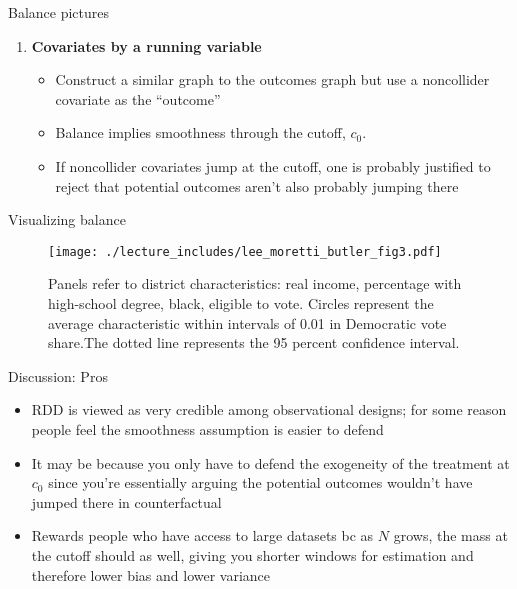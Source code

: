 \documentclass{beamer}
\begin{document}
\begin{frame}{Balance pictures}

\begin{enumerate}\addtocounter{enumi}{3}
	\item \textbf{Covariates by a running variable}
		\begin{itemize}
		\item Construct a similar graph to the outcomes graph but use a noncollider covariate as the ``outcome''
		\item Balance implies smoothness through the cutoff, $c_0$.  
		\item If noncollider covariates jump at the cutoff, one is probably justified to reject that potential outcomes aren't also probably jumping there
		\end{itemize}
	\end{enumerate}
\end{frame}

\begin{frame}{Visualizing balance}
	\begin{figure}
	\texttt{[image: ./lecture\_includes/lee\_moretti\_butler\_fig3.pdf]}
	\caption{\scriptsize Panels refer to district characteristics: real income, percentage with high-school degree, black, eligible to vote. Circles represent the average characteristic within intervals of 0.01 in Democratic vote share.The dotted line represents the 95 percent confidence interval.}
	\end{figure}
	
\end{frame}






\begin{frame}{Discussion: Pros}

\begin{itemize}
\item RDD is viewed as very credible among observational designs; for some reason people feel the smoothness assumption is easier to defend
\item It may be because you only have to defend the exogeneity of the treatment at $c_0$ since you're essentially arguing the potential outcomes wouldn't have jumped there in counterfactual
\item Rewards people who have access to large datasets bc as $N$ grows, the mass at the cutoff should as well, giving you shorter windows for estimation and therefore lower bias and lower variance
\end{itemize}

\end{frame}
\end{document}
